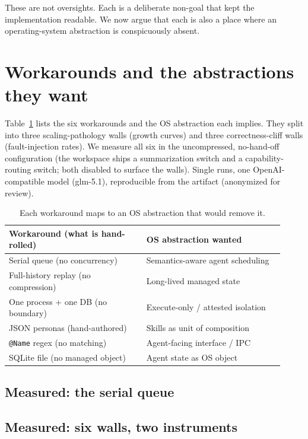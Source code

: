 \documentclass[sigconf, review, anonymous]{acmart}
\begin{document}
These are not oversights. Each is a deliberate non-goal that kept the
implementation readable. We now argue that each is also a place where an
operating-system abstraction is conspicuously absent.

\section{Workarounds and the abstractions they want}

Table~\ref{tab:map} lists the six workarounds and the OS abstraction each
implies. They split into three scaling-pathology walls (growth curves) and
three correctness-cliff walls (fault-injection rates). We measure all six in
the uncompressed, no-hand-off configuration (the workspace ships a
summarization switch and a capability-routing switch; both disabled to
surface the walls). Single runs, one OpenAI-compatible model (glm-5.1),
reproducible from the artifact (anonymized for review).

\begin{table}[t]
\caption{Each workaround maps to an OS abstraction that would remove it.}
\label{tab:map}
\small
\setlength{\tabcolsep}{4pt}
\begin{tabular}{p{0.46\linewidth} p{0.46\linewidth}}
\toprule
Workaround (what is hand-rolled) & OS abstraction wanted \\
\midrule
Serial queue (no concurrency) & Semantics-aware agent scheduling \\
Full-history replay (no compression) & Long-lived managed state \\
One process + one DB (no boundary) & Execute-only / attested isolation \\
JSON personas (hand-authored) & Skills as unit of composition \\
\texttt{@Name} regex (no matching) & Agent-facing interface / IPC \\
SQLite file (no managed object) & Agent state as OS object \\
\bottomrule
\end{tabular}
\end{table}

\subsection{Measured: the serial queue}

\subsection{Measured: six walls, two instruments}
\end{document}
